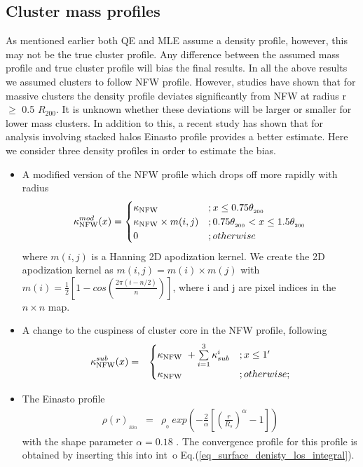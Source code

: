 \subsection{Cluster mass profiles}
As mentioned earlier both QE and MLE assume a density profile, however, this may not be the true cluster profile. 
Any difference between the assumed mass profile and true cluster profile will bias the final results.
In all the above results we assumed clusters to follow NFW profile. 
However, studies have shown that for massive clusters the density profile deviates significantly from NFW at radius r $\ge$ 0.5 $R_{200}$. 
It is unknown whether these deviations will be larger or smaller for lower mass clusters.
In addition to this, a recent study has shown that for analysis involving stacked halos Einasto profile provides a better estimate.
Here we consider three density profiles in order to estimate the bias.
\begin{itemize}
\item A modified version of the NFW profile which drops off more rapidly with radius
\begin{eqnarray}
\kappa_{\rm NFW}^{mod}(x) =
\begin{cases}
    \kappa_{\rm NFW} &; x \le 0.75\theta_{_{200}}\\
    \kappa_{\rm NFW} \times m(i,j)&; 0.75\theta_{_{200}} < x \le 1.5\theta_{_{200}}\\
    0 &; otherwise
\label{eq_kappa_mod}
\end{cases}
\end{eqnarray}
where $m(i,j)$ is a Hanning 2D apodization kernel.
We create the 2D apodization kernel as $m(i,j) = m(i) \times m(j)$ with $m(i) = \frac{1}{2} \left[ 1 - cos\left(\frac{2\pi  (i-n/2) }{n} \right)\right]$, where i and j are pixel indices in the $n \times n$ map.
\item A change to the cuspiness of cluster core in the NFW profile, following \citet{king2001} 
\begin{eqnarray}
\kappa_{\rm NFW}^{sub}(x)  & =  &
\begin{cases}
    \kappa_{\rm NFW}\ + \sum\limits_{i=1}^{3} \kappa_{sub}^{i}&; x \le 1'\\
    \kappa_{\rm NFW} &; otherwise;
\label{eq_kappa_sub}
\end{cases}
\end{eqnarray}
\item The Einasto profile \citep{einasto1989}
\begin{eqnarray}
\rho(r)_{_{Ein}} & = &  \rho_{_{0}}\ exp\left( - \frac{2}{\alpha} \left[\left(\frac{r}{R_s} \right)^{\alpha} - 1\right]\right)
\label{eq_einasto_density}
\end{eqnarray}
with the shape parameter $\alpha = 0.18$ \citep{ludlow2013}. The convergence profile for this profile is obtained by inserting this into int\
o Eq.(\ref{eq_surface_denisty_los_integral}).
\end{itemize}
 
